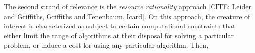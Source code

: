 The second strand of relevance is the \emph{resource rationality} approach [CITE: Leider and Griffiths, Griffiths and Tenenbaum, Icard].
On this approach, the creature of interest is characterized as subject to certain computational constraints that either limit the range of algorithms at their disposal for solving a particular problem, or induce a cost for using any particular algorithm.
Then, 
